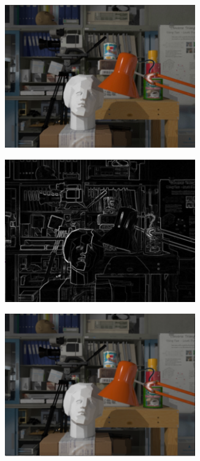 \begin{figure}[h!]
\centering
\begin{subfigure}[]{0.4\textwidth}
\centering
\includegraphics[width=0.9\textwidth]{./img/wat_left.png}
\caption{\label{fig:lw}}
\end{subfigure}
\begin{subfigure}[]{0.4\textwidth}
\centering
\includegraphics[width=0.9\textwidth]{./img/left_sobel.png}
\caption{\label{fig:lws}}
\end{subfigure}
\begin{subfigure}[]{0.4\textwidth}
\centering
\includegraphics[width=0.9\textwidth]{./img/right_wat.png}

\end{subfigure}
\end{figure}
